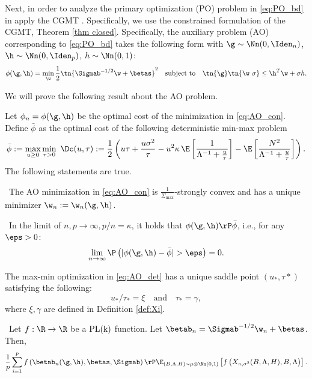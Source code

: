 Next, in order to analyze the primary optimization (PO) problem in \eqref{eq:PO_bd} in apply the CGMT \cite{thrampoulidis2015lasso}. Specifically, we use the constrained formulation of the CGMT, Theorem \ref{thm closed}.  Specifically, the auxiliary problem (AO) corresponding to \eqref{eq:PO_bd} takes the following form with $\g\sim\Nn(0,\Iden_n)$, $\h\sim\Nn(0,\Iden_p)$, $h\sim \Nn(0,1)$:%
\begin{align}
\phi(\g,\h) = \min_{\w} \frac{1}{2}\tn{\Sigmab^{-1/2}\w+\betas}^2\quad\text{subject to}\quad \tn{\g}\tn{\w~{\sigma}}\leq \h^T\w+\sigma h.\label{eq:AO_con}
\end{align}%

We will prove the following result about the AO problem.
\begin{lemma}\label{lem:AO}
Let $\phi_n=\phi(\g,\h)$ be the optimal cost of the minimization in \eqref{eq:AO_con}. Define $\bar\phi$ as the optimal cost of the following deterministic min-max problem
\begin{align}\label{eq:AO_det}
\bar\phi:=\max_{u\geq 0}\min_{\tau>0}~ \Dc(u,\tau):=\frac{1}{2}\left({u\tau} + \frac{u\sigma^2}{\tau} - u^2\kappa\,\E\left[ \frac{1}{\Lambda^{-1}+\frac{u}{\tau}} \right] - \E\left[\frac{N^2}{\Lambda^{-1}+\frac{u}{\tau}}\right] \right).
\end{align}
The following statements are true.

~The AO minimization in \eqref{eq:AO_con} is $\frac{1}{\Sigma_{\max}}$-strongly convex and has a unique minimizer $\w_n:=\w_n(\g,\h)$.

~In the limit of $n,p\rightarrow\infty, p/n=\kappa$, it holds that $\phi(\g,\h)\rP\bar\phi$, i.e., for any $\eps>0$:
$$
\lim_{n\rightarrow\infty}\P\left(|\phi(\g,\h)-\bar\phi|>\eps\right) = 0.
$$

 The max-min optimization in \eqref{eq:AO_det} has a unique saddle point $(u_*,\tau*)$ satisfying the following: 
$$
u_*/\tau_* = \xi\quad\text{and}\quad\tau_* = \gamma,
$$
where $\xi, \gamma$ are defined in Definition \ref{def:Xi}.

~Let $f:\R\rightarrow\R$ be a $\rm{PL}({k})$ function. Let $\betab_n=\Sigmab^{-1/2}\w_n + \betas$. Then,
$$
\frac{1}{p}\sum_{i=1}^{p}f\left(\betab_n(\g,\h),\betas,\Sigmab\right) \rP \E_{(B,\Lambda,H)\sim\mu\otimes	\Nn(0,1)}\left[f\left(X_{\kappa,\sigma^2}(B,\Lambda,H),B,\Lambda\right) \right].
$$

\end{lemma}




